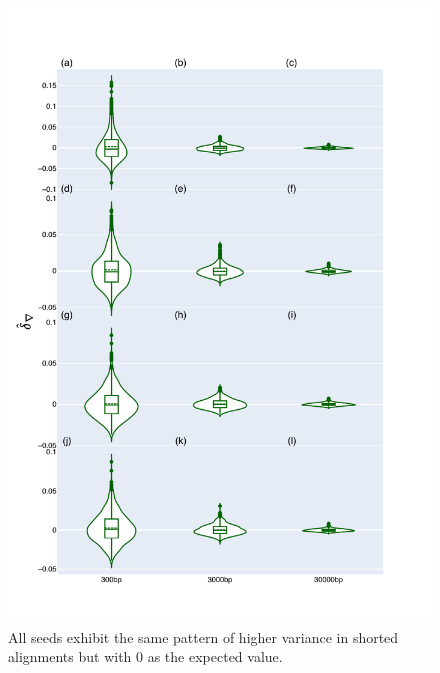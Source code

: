 \begin{figure}[!h]
\centering
\includegraphics[width=\textwidth]{figures/plots/synthetic/d-conv/all_seeds.pdf}
\caption{All seeds exhibit the same pattern of higher variance in shorted alignments but with 0 as the expected value.}
\label{fig:synthetic/d-conv/all_seeds}
\end{figure}